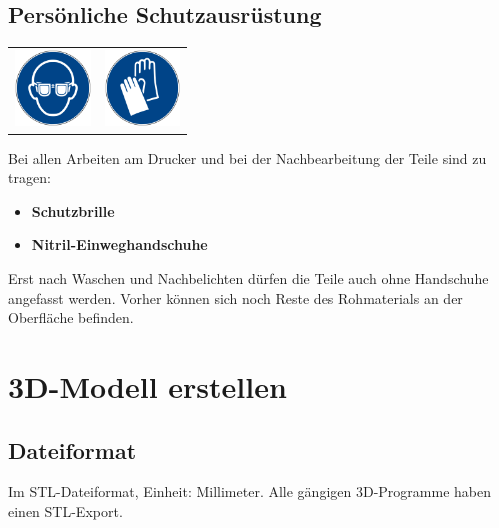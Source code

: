 \documentclass{\basedir/fablab-document}
\begin{document}

\subsection{Persönliche Schutzausrüstung}


\begin{table}[h]
    \centering
    \begin{tabular}{cc}

        \includegraphics[width=2cm]{bilder/gaugenschutz.png}  & \includegraphics[width=2cm]{bilder/ghandschuh.png} \\
    \end{tabular}
\end{table}

Bei allen Arbeiten am Drucker und bei der Nachbearbeitung der Teile sind zu tragen:
\begin{itemize}
    \item \textbf{Schutzbrille}
    \item \textbf{Nitril-Einweghandschuhe}
\end{itemize}
Erst nach Waschen und Nachbelichten dürfen die Teile auch ohne Handschuhe angefasst werden. Vorher können sich noch Reste des Rohmaterials an der Oberfläche befinden.
\newpage


\renewcommand{\contentsname}{Inhaltsverzeichnis / Arbeitsablauf}
\setcounter{tocdepth}{2}
\tableofcontents
\newpage

\section{3D-Modell erstellen}

\subsection{Dateiformat}

Im STL-Dateiformat, Einheit: Millimeter. Alle gängigen 3D-Programme haben einen STL-Export.
\end{document}
